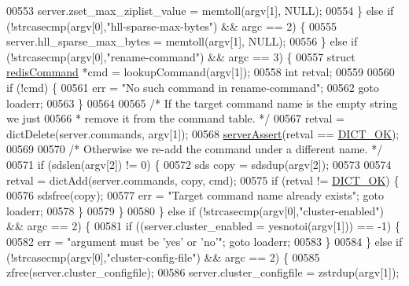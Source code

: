 \begin{DoxyCode}
{{00553             server.zset\_max\_ziplist\_value = memtoll(argv[1], NULL);
00554         \} \textcolor{keywordflow}{else} \textcolor{keywordflow}{if} (!strcasecmp(argv[0],\textcolor{stringliteral}{"hll-sparse-max-bytes"}) && argc == 2) \{
00555             server.hll\_sparse\_max\_bytes = memtoll(argv[1], NULL);
00556         \} \textcolor{keywordflow}{else} \textcolor{keywordflow}{if} (!strcasecmp(argv[0],\textcolor{stringliteral}{"rename-command"}) && argc == 3) \{
00557             \textcolor{keyword}{struct} \hyperlink{structredisCommand}{redisCommand} *cmd = lookupCommand(argv[1]);
00558             \textcolor{keywordtype}{int} retval;
00559 
00560             \textcolor{keywordflow}{if} (!cmd) \{
00561                 err = \textcolor{stringliteral}{"No such command in rename-command"};
00562                 \textcolor{keywordflow}{goto} loaderr;
00563             \}
00564 
00565             \textcolor{comment}{/* If the target command name is the empty string we just}
00566 \textcolor{comment}{             * remove it from the command table. */}
00567             retval = dictDelete(server.commands, argv[1]);
00568             \hyperlink{server_8h_a88114b5169b4c382df6b56506285e56a}{serverAssert}(retval == \hyperlink{dict_8h_a2afecbeab8f7efbc183048f52f6d17e5}{DICT\_OK});
00569 
00570             \textcolor{comment}{/* Otherwise we re-add the command under a different name. */}
00571             \textcolor{keywordflow}{if} (sdslen(argv[2]) != 0) \{
00572                 sds copy = sdsdup(argv[2]);
00573 
00574                 retval = dictAdd(server.commands, copy, cmd);
00575                 \textcolor{keywordflow}{if} (retval != \hyperlink{dict_8h_a2afecbeab8f7efbc183048f52f6d17e5}{DICT\_OK}) \{
00576                     sdsfree(copy);
00577                     err = \textcolor{stringliteral}{"Target command name already exists"}; \textcolor{keywordflow}{goto} loaderr;
00578                 \}
00579             \}
00580         \} \textcolor{keywordflow}{else} \textcolor{keywordflow}{if} (!strcasecmp(argv[0],\textcolor{stringliteral}{"cluster-enabled"}) && argc == 2) \{
00581             \textcolor{keywordflow}{if} ((server.cluster\_enabled = yesnotoi(argv[1])) == -1) \{
00582                 err = \textcolor{stringliteral}{"argument must be 'yes' or 'no'"}; \textcolor{keywordflow}{goto} loaderr;
00583             \}
00584         \} \textcolor{keywordflow}{else} \textcolor{keywordflow}{if} (!strcasecmp(argv[0],\textcolor{stringliteral}{"cluster-config-file"}) && argc == 2) \{
00585             zfree(server.cluster\_configfile);
00586             server.cluster\_configfile = zstrdup(argv[1]);
}}
\end{DoxyCode}
